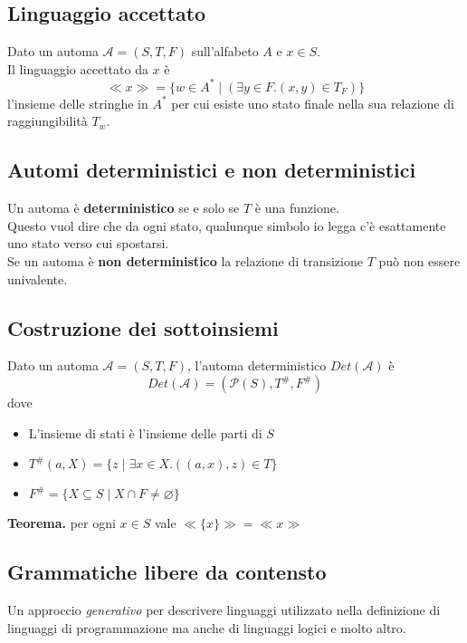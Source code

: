 \documentclass{article}
\begin{document}
\subsection*{Linguaggio accettato}
Dato un automa \(\mathcal{A} = (S,T,F)\) sull'alfabeto \(A\) e \(x \in S\). \\
Il linguaggio accettato da \(x\) è
\[\ll x \gg = \{w \in A^* \mid (\exists y \in F . (x,y) \in T_F)\}\]
l'insieme delle stringhe in \(A^*\) per cui esiste uno stato finale nella sua relazione di raggiungibilità \(T_w\).
\subsection*{Automi deterministici e non deterministici}
Un automa è \textbf{deterministico} se e solo se \(T\) è una funzione. \\
Questo vuol dire che da ogni stato, qualunque simbolo io legga c'è esattamente uno stato verso cui spostarsi. \\
Se un automa è \textbf{non deterministico} la relazione di transizione \(T\) può non essere univalente.
\subsection*{Costruzione dei sottoinsiemi}
Dato un automa \(\mathcal{A} = (S,T,F)\), l'automa deterministico \(Det(\mathcal{A})\) è
\[Det(\mathcal{A}) = (\mathcal{P}(S), T^\#, F^\#)\]
dove
\begin{itemize}
    \item L'insieme di stati è l'insieme delle parti di \(S\)
    \item \(T^{\#}(a,X) = \{z \mid \exists x \in X . ((a,x),z) \in T\}\)
    \item \(F^{\#} = \{X \subseteq S \mid X \cap F \neq \varnothing\}\)
\end{itemize}
\textbf{Teorema.} per ogni \(x \in S\) vale \(\ll \{x\} \gg = \ll x \gg\)

\subsection{Grammatiche libere da contensto}
Un approccio \emph{generativo} per descrivere linguaggi utilizzato nella definizione di linguaggi di programmazione ma anche di linguaggi logici e molto altro.
\end{document}
